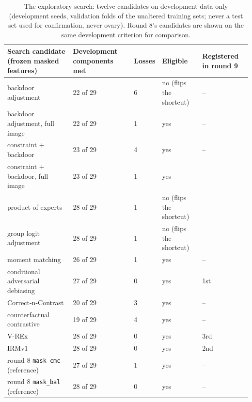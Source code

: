 \begin{table}[H]\centering\scriptsize
\caption{The exploratory search: twelve candidates on development data only (development seeds, validation folds of the unaltered training sets; never a test set used for confirmation, never ovary). Round 8's candidates are shown on the same development criterion for comparison.}\label{tab:search}
\begin{tabular}{p{5.4cm}p{2.4cm}p{1.0cm}p{2.8cm}p{2.2cm}}\toprule
Search candidate (frozen masked features) & Development components met & Losses & Eligible & Registered in round 9 \\\midrule
backdoor adjustment & 22 of 29 & 6 & no (flips the shortcut) & -- \\
backdoor adjustment, full image & 22 of 29 & 1 & yes & -- \\
constraint + backdoor & 23 of 29 & 4 & yes & -- \\
constraint + backdoor, full image & 23 of 29 & 1 & yes & -- \\
product of experts & 28 of 29 & 1 & no (flips the shortcut) & -- \\
group logit adjustment & 28 of 29 & 1 & no (flips the shortcut) & -- \\
moment matching & 26 of 29 & 1 & yes & -- \\
conditional adversarial debiasing & 27 of 29 & 0 & yes & 1st \\
Correct-n-Contrast & 20 of 29 & 3 & yes & -- \\
counterfactual contrastive & 19 of 29 & 4 & yes & -- \\
V-REx & 28 of 29 & 0 & yes & 3rd \\
IRMv1 & 28 of 29 & 0 & yes & 2nd \\
round 8 \texttt{mask\_cmc} (reference) & 27 of 29 & 1 & yes & -- \\
round 8 \texttt{mask\_bal} (reference) & 28 of 29 & 0 & yes & -- \\
\bottomrule\end{tabular}
\end{table}
